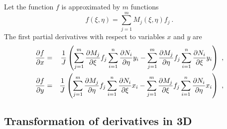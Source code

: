 Let the function $f$ is approximated by $m$ functions
\begin{equation}
f(\xi,\eta) = \sum_{j=1}^{m} M_j(\xi,\eta) f_j\ .
\end{equation}
The first partial derivatives with respect to variables $x$ and $y$ are
\begin{eqnarray}
\ppd{f}{x} &=& \del{1}{J}\left(\sum_{j=1}^{m} \ppd{M_j}{\xi} f_j  \sum_{i=1}^{n} \ppd{N_i}{\eta} y_i -
\sum_{j=1}^{m} \ppd{M_j}{\eta} f_j  \sum_{i=1}^{n} \ppd{N_i}{\xi} y_i\right)\ ,
\\
\ppd{f}{y} &=& \del{1}{J}\left(\sum_{j=1}^{m} \ppd{M_j}{\eta} f_j  \sum_{i=1}^{n} \ppd{N_i}{\xi} x_i -
\sum_{j=1}^{m} \ppd{M_j}{\xi} f_j  \sum_{i=1}^{n} \ppd{N_i}{\eta} x_i\right)\ ,
\end{eqnarray}



\subsection{Transformation of derivatives in 3D}

